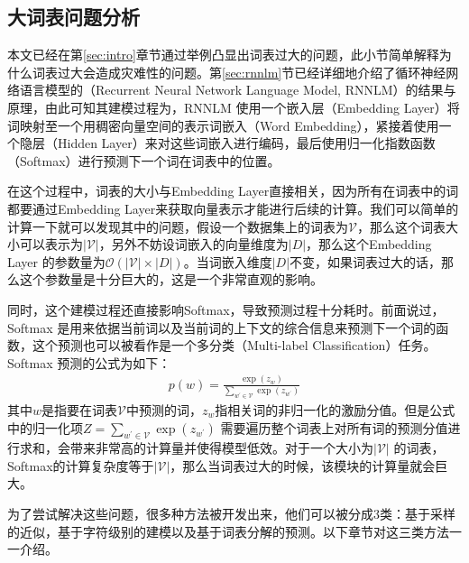\documentclass[12pt,a4paper]{article}
\begin{document}
\subsection{大词表问题分析}
\label{sec:vocab}
本文已经在第\ref{sec:intro}章节通过举例凸显出词表过大的问题，此小节简单解释为什么词表过大会造成灾难性的问题。第\ref{sec:rnnlm}节已经详细地介绍了循环神经网络语言模型的（Recurrent Neural Network Language Model, RNNLM）的结果与原理，由此可知其建模过程为，RNNLM 使用一个嵌入层（Embedding Layer）将词映射至一个用稠密向量空间的表示词嵌入（Word Embedding），紧接着使用一个隐层（Hidden Layer）来对这些词嵌入进行编码，最后使用归一化指数函数（Softmax）进行预测下一个词在词表中的位置。

在这个过程中，词表的大小与Embedding Layer直接相关，因为所有在词表中的词都要通过Embedding Layer来获取向量表示才能进行后续的计算。我们可以简单的计算一下就可以发现其中的问题，假设一个数据集上的词表为$\mathcal{V}$，那么这个词表大小可以表示为${|\mathcal{V}|}$，另外不妨设词嵌入的向量维度为${|D|}$，那么这个Embedding Layer 的参数量为${\mathcal{O}(|\mathcal{V}| \times |D|)}$。当词嵌入维度${|D|}$不变，如果词表过大的话，那么这个参数量是十分巨大的，这是一个非常直观的影响。

同时，这个建模过程还直接影响Softmax，导致预测过程十分耗时。前面说过，Softmax 是用来依据当前词以及当前词的上下文的综合信息来预测下一个词的函数，这个预测也可以被看作是一个多分类（Multi-label Classification）任务。Softmax 预测的公式为如下：
\begin{equation}\label{eq:softmax}
\begin{split}
	p(w)=\frac{\exp(z_w)}{\sum_{w^{'}\in\mathcal{V}} {\exp(z_{w^{'}})}}
\end{split}
\end{equation}
其中$w$是指要在词表$\mathcal{V}$中预测的词，$z_w$指相关词的非归一化的激励分值。但是公式中的归一化项${Z=\sum_{w^{'}\in\mathcal{V}} {\exp(z_{w^{'}})}}$ 需要遍历整个词表上对所有词的预测分值进行求和，会带来非常高的计算量并使得模型低效。对于一个大小为${|\mathcal{V}|}$ 的词表，Softmax的计算复杂度等于${\mathcal{|\mathcal{V}|}}$，那么当词表过大的时候，该模块的计算量就会巨大。

为了尝试解决这些问题，很多种方法被开发出来，他们可以被分成3类：基于采样的近似，基于字符级别的建模以及基于词表分解的预测。以下章节对这三类方法一一介绍。
\end{document}
